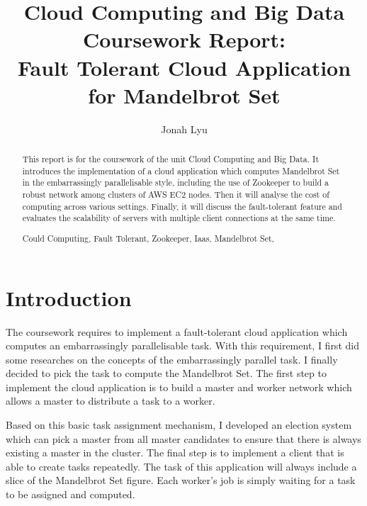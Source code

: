 \documentclass[runningheads,a4paper]{llncs}
\newcommand{\keywords}[1]{\par\addvspace\baselineskip
\noindent\keywordname\enspace\ignorespaces#1}
\begin{document}
\mainmatter  %

\title{Cloud Computing and Big Data\\Coursework Report:\\
Fault Tolerant Cloud Application for Mandelbrot Set}


\author{Jonah Lyu}



\maketitle


\begin{abstract}
This report is for the coursework of the unit Cloud Computing and Big Data. It introduces the implementation of a cloud application which computes Mandelbrot Set in the embarrassingly parallelisable style, including the use of Zookeeper to build a robust network among clusters of AWS EC2 nodes. Then it will analyse the cost of computing across various settings. Finally, it will discuss the fault-tolerant feature and evaluates the scalability of servers with multiple client connections at the same time.

\keywords{Could Computing, Fault Tolerant, Zookeeper, Iaas, Mandelbrot Set,}

\end{abstract}

\section{Introduction}

The coursework requires to implement a fault-tolerant cloud application which computes an embarrassingly parallelisable task. With this requirement, I first did some researches on the concepts of the embarrassingly parallel task. I finally decided to pick the task to compute the Mandelbrot Set. The first step to implement the cloud application is to build a master and worker network which allows a master to distribute a task to a worker. 

Based on this basic task assignment mechanism, I developed an election system which can pick a master from all master candidates to ensure that there is always existing a master in the cluster. The final step is to implement a client that is able to create tasks repeatedly. The task of this application will always include a slice of the Mandelbrot Set figure. Each worker's job is simply waiting for a task to be assigned and computed. 
\end{document}
